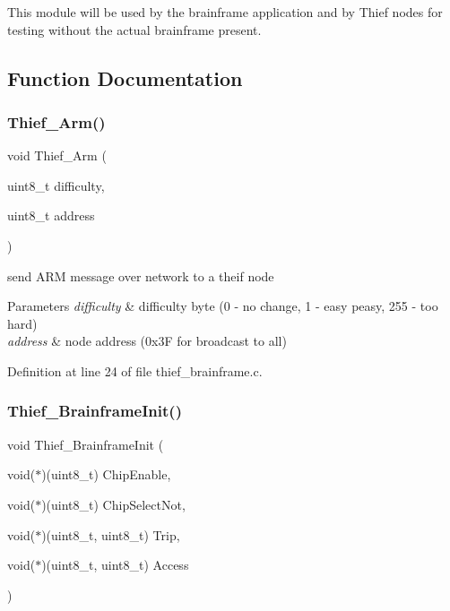 This module will be used by the brainframe application and by Thief nodes for testing without the actual brainframe present. 

\subsection{Function Documentation}
\mbox{\label{group__thief__brainframe_gaf4b9fbc4453a50a19a28ecee8ed63044}} 
\subsubsection{\texorpdfstring{Thief\_Arm()}{Thief\_Arm()}}
{\footnotesize\ttfamily void Thief\+\_\+\+Arm (\begin{DoxyParamCaption}\item[{uint8\+\_\+t}]{difficulty,  }\item[{uint8\+\_\+t}]{address }\end{DoxyParamCaption})}



send A\+RM message over network to a theif node 


\begin{DoxyParams}{Parameters}
{\em difficulty} & difficulty byte (0 -\/ no change, 1 -\/ easy peasy, 255 -\/ too hard) \\
\hline
{\em address} & node address (0x3F for broadcast to all) \\
\hline
\end{DoxyParams}


Definition at line 24 of file thief\+\_\+brainframe.\+c.

\mbox{\label{group__thief__brainframe_ga9a9be1f1330ceab71417b4f6896c6596}} 
\subsubsection{\texorpdfstring{Thief\_BrainframeInit()}{Thief\_BrainframeInit()}}
{\footnotesize\ttfamily void Thief\+\_\+\+Brainframe\+Init (\begin{DoxyParamCaption}\item[{void($\ast$)(uint8\+\_\+t)}]{Chip\+Enable,  }\item[{void($\ast$)(uint8\+\_\+t)}]{Chip\+Select\+Not,  }\item[{void($\ast$)(uint8\+\_\+t, uint8\+\_\+t)}]{Trip,  }\item[{void($\ast$)(uint8\+\_\+t, uint8\+\_\+t)}]{Access }\end{DoxyParamCaption})}




